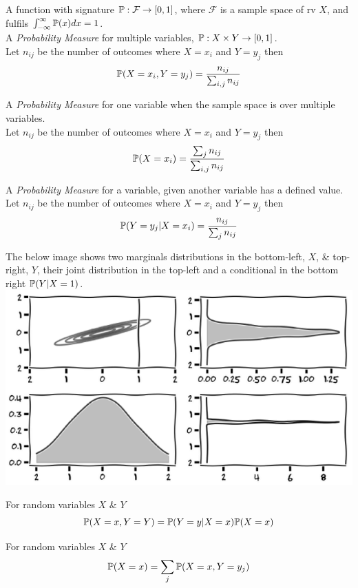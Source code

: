 \documentclass[11pt,a4paper]{article}
\begin{document}
A function with signature $\mathbb{P}:\mathcal{F}\to[0,1]$, where $\mathcal{F}$ is a sample space of rv $X$, and fulfils $\int_{-\infty}^{\infty}\mathbb{P}(x)dx=1$.\\

A \textit{Probability Measure} for multiple variables, $\mathbb{P}:X\times Y\to[0,1]$.\\
Let $n_{ij}$ be the number of outcomes where $X=x_i$ and $Y=y_j$ then
$$\mathbb{P}(X=x_i,Y=y_j)=\frac{n_{ij}}{\sum_{i,j}n_{ij}}$$

A \textit{Probability Measure} for one variable when the sample space is over multiple variables.\\
Let $n_{ij}$ be the number of outcomes where $X=x_i$ and $Y=y_j$ then
$$\mathbb{P}(X=x_i)=\frac{\sum_jn_{ij}}{\sum_{i,j}n_{ij}}$$

A \textit{Probability Measure} for a variable, given another variable has a defined value.
Let $n_{ij}$ be the number of outcomes where $X=x_i$ and $Y=y_j$ then
$$\mathbb{P}(Y=y_j|X=x_i)=\frac{n_{ij}}{\sum_{j}n_{ij}}$$

The below image shows two marginals distributions in the bottom-left, $X$, \& top-right, $Y$, their joint distribution in the top-left and a conditional in the bottom right $\mathbb{P}(Y|X=1)$.\\
\includegraphics[scale=2]{img/probExamples.png}

For random variables $X$ \& $Y$
$$\mathbb{P}(X=x,Y=Y)=\mathbb{P}(Y=y|X=x)\mathbb{P}(X=x)$$

For random variables $X$ \& $Y$
$$\mathbb{P}(X=x)=\sum_j\mathbb{P}(X=x,Y=y_j)$$
\end{document}
